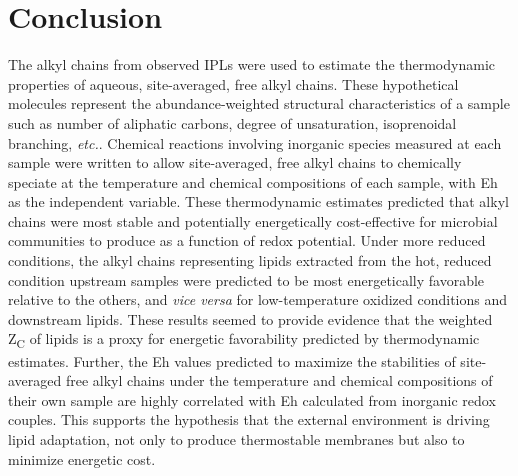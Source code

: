 \section{Conclusion}
The alkyl chains from observed IPLs were used to estimate the thermodynamic properties of aqueous, site-averaged, free alkyl chains. These hypothetical molecules represent the abundance-weighted structural characteristics of a sample such as number of aliphatic carbons, degree of unsaturation, isoprenoidal branching, \textit{etc.}. Chemical reactions involving inorganic species measured at each sample were written to allow site-averaged, free alkyl chains to chemically speciate at the temperature and chemical compositions of each sample, with Eh as the independent variable. These thermodynamic estimates predicted that alkyl chains were most stable and potentially energetically cost-effective for microbial communities to produce as a function of redox potential. Under more reduced conditions, the alkyl chains representing lipids extracted from the hot, reduced condition upstream samples were predicted to be most energetically favorable relative to the others, and \textit{vice versa} for low-temperature oxidized conditions and downstream lipids. These results seemed to provide evidence that the weighted Z\textsubscript{C} of lipids is a proxy for energetic favorability predicted by thermodynamic estimates. Further, the Eh values predicted to maximize the stabilities of site-averaged free alkyl chains under the temperature and chemical compositions of their own sample are highly correlated with Eh calculated from inorganic redox couples. This supports the hypothesis that the external environment is driving lipid adaptation, not only to produce thermostable membranes but also to minimize energetic cost.

